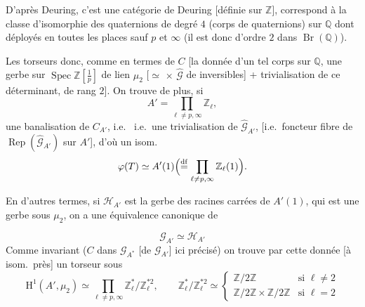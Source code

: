 \documentclass[11pt,a4paper]{article}
\begin{document}
D'après Deuring, c'est une catégorie de Deuring [définie sur $\mathbb{Z}$],
 correspond à la classe d'isomorphie des 
quaternions de degré $4$ (corps de quaternions) sur $\mathbb{Q}$ dont
déployés en toutes les places sauf $p$ et $\infty$ (il est donc d'ordre $2$
dans $\operatorname{Br}(\mathbb{Q})$).

Les torseurs donc, comme \ill{} en termes de \struck{\ill{}} $C$ \ill{}
[la donnée d'un tel corps sur $\mathbb{Q}$, une
gerbe sur $\operatorname{Spec} \mathbb{Z}[\tfrac{1}{p}]$ de
 lien $\mu_{2}$ [$\simeq$ \ill{} $\times$ $\widehat{\mathcal{G}}$
de inversibles] + trivialisation de ce déterminant, de rang $2$].
On trouve de plus, si
\[
  A' = \prod_{\ell \neq p, \infty} \mathbb{Z}_{\ell},
\]
une banalisation de $C_{A'}$, i.e.~
i.e.\ une trivialisation de $\widehat{\mathcal{G}}_{A'}$,
[i.e.\ foncteur fibre de $\operatorname{Rep}(\widehat{\mathcal{G}}_{A'})$ sur
$A'$], d'où un isom.
\[
  \varphi(T) \simeq A'(1) \Bigl(\overset{\mathrm{df}}{=}
  \prod_{\ell \neq p, \infty} \mathbb{Z}_{\ell}(1)\Bigr).
\]

 En d'autres termes, si
$\mathcal{H}_{A'}$ est la gerbe des racines carrées de $A'(1)$, qui est une
gerbe sous $\mu_{2}$, on a une équivalence canonique de

\[
  \mathcal{G}_{A'} \simeq \mathcal{H}_{A'}
\]
Comme invariant ($C$ dans $\mathcal{G}_{A^{*}}$ [de $\mathcal{G}_{A'}$]
\ill{} ici précisé) on trouve par cette donnée [à isom.\ près]
 un torseur sous
\[
  \mathrm{H}^{1}(A', \mu_{2}) \simeq \prod_{\ell \neq p, \infty}
  \mathbb{Z}_{\ell}^{*}/\mathbb{Z}_{\ell}^{*2},
  \qquad
  \mathbb{Z}_{\ell}^{*}/\mathbb{Z}_{\ell}^{*2} \simeq
  \begin{cases}
    \mathbb{Z}/2\mathbb{Z} & \text{si } \ell \neq 2 \\
    \mathbb{Z}/2\mathbb{Z} \times \mathbb{Z}/2\mathbb{Z} & \text{si } \ell = 2
  \end{cases}
\]
\end{document}
